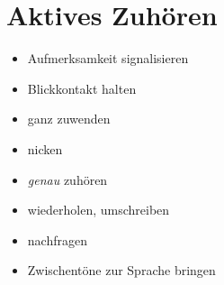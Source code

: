 \section{Aktives Zuhören}
\label{aktives-zuhoeren}

\begin{itemize}
    \item Aufmerksamkeit signalisieren
    \item Blickkontakt halten
    \item ganz zuwenden
    \item nicken
    \item \emph{genau} zuhören
    \item wiederholen, umschreiben
    \item nachfragen
    \item \glqq Zwischentöne\grqq{} zur Sprache bringen
\end{itemize}
